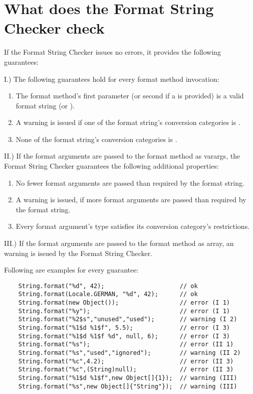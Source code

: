 \section{What does the Format String Checker check\label{formatter-bugs}}

If the Format String Checker issues no errors, it provides the following guarantees:

\noindent I.) The following guarantees hold for every format method invocation:

\begin{enumerate} 
    \item The format method's first parameter (or second if a  is provided) is a valid 
        format string (or ).
    \item A warning is issued if one of the format string's conversion categories is .
    \item None of the format string's conversion categories is .
\end{enumerate} 

\noindent II.) If the format arguments are passed to the format method as varargs, the
Format String Checker guarantees the following additional properties:

\begin{enumerate} 
\item No fewer format arguments are passed than required by the format string.
\item A warning is issued, if more format arguments are passed than required by the format string.
\item Every format argument's type satisfies its conversion category's restrictions.
\end{enumerate}

\noindent III.) If the format arguments are passed to the format method as array, 
an warning is issued by the Format String Checker.

\noindent Following are examples for every guarantee:

\begin{Verbatim}
    String.format("%d", 42);                     // ok
    String.format(Locale.GERMAN, "%d", 42);      // ok
    String.format(new Object());                 // error (I 1)
    String.format("%y");                         // error (I 1)
    String.format("%2$s","unused","used");       // warning (I 2)
    String.format("%1$d %1$f", 5.5);             // error (I 3)
    String.format("%1$d %1$f %d", null, 6);      // error (I 3)
    String.format("%s");                         // error (II 1)
    String.format("%s","used","ignored");        // warning (II 2)
    String.format("%c",4.2);                     // error (II 3)
    String.format("%c",(String)null);            // error (II 3)
    String.format("%1$d %1$f",new Object[]{1});  // warning (III)
    String.format("%s",new Object[]{"String"});  // warning (III)
\end{Verbatim}

